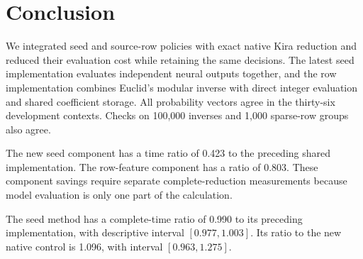 \documentclass[11pt,a4paper]{article}
\begin{document}



























\clearpage









\newcommand{\CoverageVacuumDerivation}{Section~\ref{sec:higher-loop-generation}}


\section{Conclusion}
\label{sec:conclusion}
We integrated seed and source-row policies with exact native Kira reduction
and reduced their evaluation cost while retaining the same decisions.
The latest seed implementation evaluates independent neural outputs together,
and the row implementation combines Euclid's modular inverse with direct
integer evaluation and shared coefficient storage.
All probability vectors agree in the thirty-six development contexts.
Checks on 100,000 inverses and 1,000 sparse-row groups also agree.

The new seed component has a time ratio of 0.423 to the preceding shared implementation. The row-feature component has a ratio of 0.803. These component savings require separate complete-reduction measurements because model evaluation is only one part of the calculation.

The seed method has a complete-time ratio of 0.990 to its preceding implementation, with descriptive interval $[0.977,1.003]$. Its ratio to the new native control is 1.096, with interval $[0.963,1.275]$.
\end{document}
